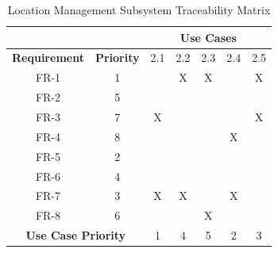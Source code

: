 \documentclass{article}
\begin{document}
\begin{enumerate}
\begin{table}[]
\centering
\caption{Location Management Subsystem Traceability Matrix}
\label{my-label}
\begin{tabular}{cc|c|c|c|c|c|}
\cline{3-7}
                                           &                   & \multicolumn{5}{c|}{\textbf{Use Cases}} \\ \hline
\multicolumn{1}{|c|}{\textbf{Requirement}} & \textbf{Priority} & 2.1    & 2.2    & 2.3   & 2.4   & 2.5   \\ \hline
\multicolumn{1}{|c|}{FR-1}                 & 1                 &        & X      & X     &       & X     \\ \hline
\multicolumn{1}{|c|}{FR-2}                 & 5                 &        &        &       &       &       \\ \hline
\multicolumn{1}{|c|}{FR-3}                 & 7                 & X      &        &       &       & X     \\ \hline
\multicolumn{1}{|c|}{FR-4}                 & 8                 &        &        &       & X     &       \\ \hline
\multicolumn{1}{|c|}{FR-5}                 & 2                 &        &        &       &       &       \\ \hline
\multicolumn{1}{|c|}{FR-6}                 & 4                 &        &        &       &       &       \\ \hline
\multicolumn{1}{|c|}{FR-7}                 & 3                 & X      & X      &       & X     &       \\ \hline
\multicolumn{1}{|c|}{FR-8}                 & 6                 &        &        & X     &       &       \\ \hline
\multicolumn{2}{|c|}{\textbf{Use Case Priority}}               & 1      & 4      & 5     & 2     & 3     \\ \hline
\end{tabular}
\end{table}



\end{enumerate}
\end{document}
